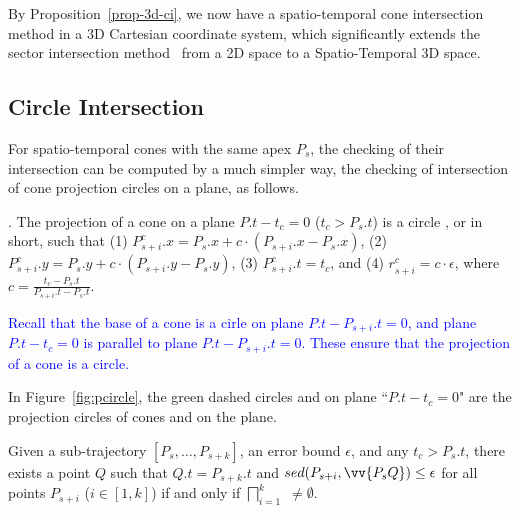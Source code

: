 By Proposition~\ref{prop-3d-ci}, we now have a spatio-temporal cone intersection method in a 3D Cartesian coordinate system, which significantly extends the sector intersection method~\cite{Williams:Longest, Sklansky:Cone, Zhao:Sleeve} {from a 2D space to a Spatio-Temporal 3D space}.






\subsection{Circle Intersection}
\label{subsec-ProjectionCircle}

For spatio-temporal cones with the same apex $P_s$, the checking of their intersection can be computed by a much simpler way, \ie the checking of intersection of cone projection circles on a plane, as follows.

. The projection of a cone  on a plane $P.t- t_c = 0$ ($t_c > P_s.t$) is a circle , or  in short, such that
%
(1) $P^c_{s+i}.x = P_s.x +  c\cdot(P_{s+i}.x- P_{s}.x)$,
%
(2) $P^c_{s+i}.y = P_s.y +  c\cdot(P_{s+i}.y- P_{s}.y)$,
%
(3) $P^c_{s+i}.t = t_c$, and
%
(4) $r^c_{s+i} =c\cdot\epsilon$, where $c=\frac{t_c - P_s.t}{P_{s+i}.t - P_s.t}$.


\textcolor{blue}{Recall that the base of a cone  is a cirle on plane $P.t-P_{s+i}.t = 0$, and plane $P.t- t_c = 0$ is parallel to plane $P.t-P_{s+i}.t = 0$. These  ensure that the projection of a cone is a circle.}

In Figure~\ref{fig:pcircle}, the green dashed circles  and  on plane ``$P.t-t_{c}=0$" are the projection circles of cones  and  on the plane.




\begin{prop}
\label{prop-circle-intersection}
Given a sub-trajectory $[P_s,\ldots, P_{s+k}]$, an error bound $\epsilon$, and any $t_c > P_s.t$, there exists a point $Q$ such that $Q.t = P_{s+k}.t$ and $sed(P_{s+i}, \vv{P_sQ})\le \epsilon$ for all points $P_{s+i}$ ($i \in [1,k]$) if and only if $\bigsqcap_{i=1}^{k}$ $\ne \emptyset$.
\end{prop}


